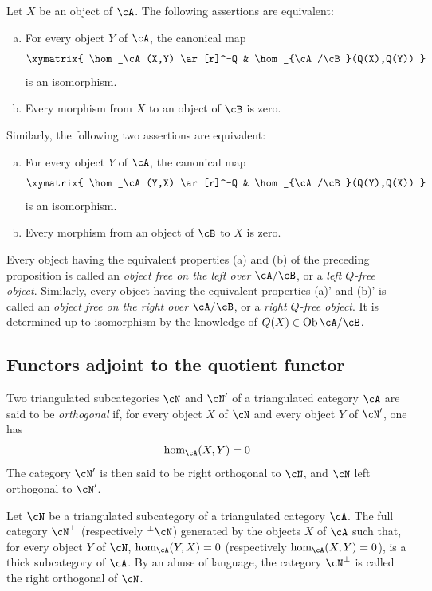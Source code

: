 \begin{proposition}\label{VIII:2-5-3}
Let $X$ be an object of $\cA$. The following assertions are equivalent:
\begin{enumerate}[(a)]
  \item For every object $Y$ of $\cA$, the canonical map
    \[\xymatrix{
      \hom_\cA(X,Y) \ar[r]^-Q
        & \hom_{\cA/\cB}(Q(X),Q(Y))
    }\]
    is an isomorphism.
  \item Every morphism from $X$ to an object of $\cB$ is zero.
\end{enumerate}
Similarly, the following two assertions are equivalent:
\begin{enumerate}[(a)']
  \item For every object $Y$ of $\cA$, the canonical map
    \[\xymatrix{
      \hom_\cA(Y,X) \ar[r]^-Q
        & \hom_{\cA/\cB}(Q(Y),Q(X))
    }\]
    is an isomorphism.
  \item Every morphism from an object of $\cB$ to $X$ is zero.
\end{enumerate}
\end{proposition}

\begin{definition}\label{VIII:2-5-4}
Every object having the equivalent properties (a) and (b) of the preceding
proposition is called an \emph{object free on the left over $\cA/\cB$},
or a \emph{left $Q$-free object}. Similarly, every object having the
equivalent properties (a)' and (b)' is called an \emph{object free on the
right over $\cA/\cB$}, or a \emph{right $Q$-free object}. It is determined
up to isomorphism by the knowledge of
$Q(X)\in\operatorname{Ob}{\cA/\cB}$.
\end{definition}

\subsection{Functors adjoint to the quotient functor}\label{VIII:2-6}

\begin{definition}\label{VIII:2-6-1}
Two triangulated subcategories $\cN$ and $\cN'$ of a triangulated category
$\cA$ are said to be \emph{orthogonal} if, for every object $X$ of $\cN$
and every object $Y$ of $\cN'$, one has
\[
  \hom_\cA(X,Y) = 0
\]
The category $\cN'$ is then said to be right orthogonal to $\cN$, and
$\cN$ left orthogonal to $\cN'$.
\end{definition}

\begin{proposition}\label{VIII:2-6-2}
Let $\cN$ be a triangulated subcategory of a triangulated category $\cA$.
The full category $\cN^\bot$ (respectively $^\bot\cN$) generated by the
objects $X$ of $\cA$ such that, for every object $Y$ of $\cN$,
$\hom_\cA(Y,X)=0$ (respectively $\hom_\cA(X,Y)=0$), is a thick subcategory
of $\cA$. By an abuse of language, the category $\cN^\bot$ is called the
right orthogonal of $\cN$.
\end{proposition}

